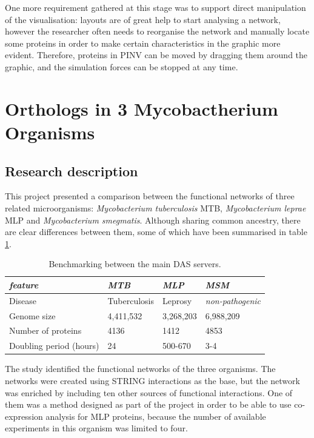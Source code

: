 One more requirement gathered at this stage was to support direct manipulation of the visualisation: layouts are of great help to start analysing a network, however the researcher often needs to reorganise the network and manually locate some proteins in order to make  certain characteristics in the graphic more evident. Therefore, proteins in PINV can be moved by dragging them around the graphic, and the simulation forces can be stopped at any time.


\section{Orthologs in 3 Mycobactherium Organisms}\label{sec:orthologs}
\subsection{Research description}
This project presented a comparison between the functional networks of three related microorganisms: \emph{Mycobacterium tuberculosis} MTB, \emph{Mycobacterium leprae} MLP and \emph{Mycobacterium smegmatis}. Although sharing common ancestry, there are clear differences between them, some of which have been summarised in table \ref{tab:orthologs}.


\begin{table}[!ht]
        \begin{tabular}{|p{6cm}|p{3cm}|p{3cm}|p{3cm}|}
\hline 
\emph{feature} & \emph{MTB} & \emph{MLP} & \emph{MSM}\\
\hline 
Disease & Tuberculosis & Leprosy & \emph{non-pathogenic}\\
\hline 
Genome size & 4,411,532 & 3,268,203 & 6,988,209\\
\hline 
Number of proteins & 4136 & 1412 & 4853\\
\hline 
Doubling period (hours) & 24  & 500-670 & 3-4 \\
\hline 
        \end{tabular}
        \caption{Benchmarking between the main DAS servers.}
        \label{tab:orthologs}
\end{table}

The study identified the functional networks of the three organisms. The networks were created using STRING interactions as the base, but the network was enriched by including ten other sources of functional interactions. One of them was a method designed as part of the project in order to be able to use co-expression analysis for MLP proteins, because the number of available experiments in this organism was limited to four.

